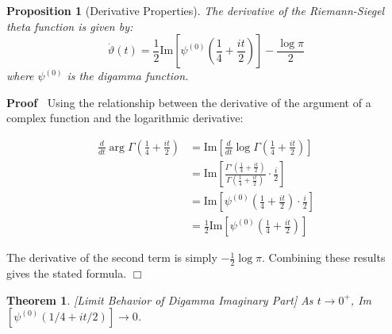 \documentclass{article}
\newenvironment{proof}{\noindent\textbf{Proof\ }}{\hspace*{\fill}$\Box$\medskip}
\newtheorem{proposition}{Proposition}
\newtheorem{theorem}{Theorem}
\begin{document}
\begin{proposition}[Derivative Properties]
  The derivative of the Riemann-Siegel theta function is given by:
  \begin{equation}
    \dot{\vartheta} (t) = \frac{1}{2}  \text{Im} \left[ \psi^{(0)}  \left(
    \frac{1}{4} + \frac{it}{2} \right) \right] - \frac{\log \pi}{2}
  \end{equation}
  where $\psi^{(0)}$ is the digamma function.
\end{proposition}

\begin{proof}
  Using the relationship between the derivative of the argument of a complex
  function and the logarithmic derivative:
  
  \begin{align}
    \frac{d}{dt} \arg \Gamma \left( \frac{1}{4} + \frac{it}{2} \right) & =
    \text{Im} \left[ \frac{d}{dt} \log \Gamma \left( \frac{1}{4} +
    \frac{it}{2} \right) \right] \\
    & = \text{Im} \left[ \frac{\Gamma' (\frac{1}{4} + \frac{it}{2})}{\Gamma
    (\frac{1}{4} + \frac{it}{2})} \cdot \frac{i}{2} \right] \\
    & = \text{Im} \left[ \psi^{(0)}  \left( \frac{1}{4} + \frac{it}{2}
    \right) \cdot \frac{i}{2} \right] \\
    & = \frac{1}{2}  \text{Im} \left[ \psi^{(0)}  \left( \frac{1}{4} +
    \frac{it}{2} \right) \right] 
  \end{align}
  
  The derivative of the second term is simply $- \frac{1}{2} \log \pi$.
  Combining these results gives the stated formula.
\end{proof}

\begin{theorem}
  \label{limit-behavior}[Limit Behavior of Digamma Imaginary Part] As $t \to
  0^+$, Im$[\psi^{(0)} (1 / 4 + it / 2)] \to 0$.
\end{theorem}
\end{document}
